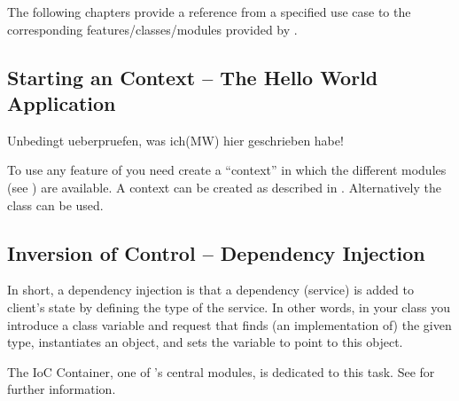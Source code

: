 The following chapters provide a reference from a specified use case to the corresponding features/classes/modules provided by \AMBETH.

\subsection{Starting an \AMBETH Context -- The Hello World Application}

\TODO Unbedingt ueberpruefen, was ich(MW) hier geschrieben habe!

To use any feature of \AMBETH you need create a ``context'' in which the different modules (see ) are available. A context can be created as described in . Alternatively the  class can be used. 

\subsection{Inversion of Control -- Dependency Injection}

In short, a dependency injection is that a dependency (service) is added to client's state by defining the type of the service. In other words, in your class you introduce a class variable and request that \AMBETH finds (an implementation of) the given type, instantiates an object, and sets the variable to point to this object.

The IoC Container, one of \AMBETH's central modules, is dedicated to this task. See  for further information. 

